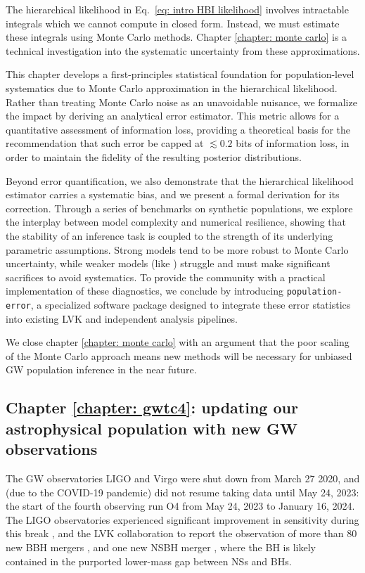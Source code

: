 \begin{refsection}
The hierarchical likelihood in Eq.~\ref{eq: intro HBI likelihood} involves intractable integrals which we cannot compute in closed form. Instead, we must estimate these integrals using Monte Carlo methods. Chapter \ref{chapter: monte carlo} is a technical investigation into the systematic uncertainty from these approximations. 

This chapter develops a first-principles statistical foundation for population-level systematics due to Monte Carlo approximation in the hierarchical likelihood. Rather than treating Monte Carlo noise as an unavoidable nuisance, we formalize the impact by deriving an analytical error estimator. This metric allows for a quantitative assessment of information loss, providing a theoretical basis for the recommendation that such error be capped at $\lesssim 0.2$ bits of information loss, in order  to maintain the fidelity of the resulting posterior distributions.

Beyond error quantification, we also demonstrate that the hierarchical likelihood estimator carries a systematic bias, and we present a formal derivation for its correction. Through a series of benchmarks on synthetic populations, we explore the interplay between model complexity and numerical resilience, showing that the stability of an inference task is coupled to the strength of its underlying parametric assumptions. Strong models tend to be more robust to Monte Carlo uncertainty, while weaker models (like \PixelPop) struggle and must make significant sacrifices to avoid systematics. To provide the community with a practical implementation of these diagnostics, we conclude by introducing \texttt{population-error}, a specialized software package designed to integrate these error statistics into existing \ac{LVK} and independent analysis pipelines.

We close chapter \ref{chapter: monte carlo} with an argument that the poor scaling of the Monte Carlo approach means new methods will be necessary for unbiased \ac{GW} population inference in the near future.

\subsection{Chapter \ref{chapter: gwtc4}: updating our astrophysical population with new \ac{GW} observations}

The \ac{GW} observatories \ac{LIGO} \citep{TheLIGOScientific:2014jea} and Virgo \citep{VIRGO:2014yos} were shut down from March 27 2020, and (due to the COVID-19 pandemic) did not resume taking data until May 24, 2023: the start of the fourth observing run O4 \citep{Capote:2024rmo, LIGO:2024kkz} from May 24, 2023 to January
16, 2024. The LIGO observatories experienced significant improvement in sensitivity during this break \citep{LIGO:2020zwl,LIGOO4Detector:2023wmz,LIGO:2024kkz}, and the \ac{LVK} collaboration to report the observation of more than $80$ new \ac{BBH} mergers \citep{abac_gwtc-40_catalog_2025}, and one new \ac{NSBH} merger \citep{abac_observation_2024}, where the \ac{BH} is likely contained in the purported lower-mass gap between \acp{NS} and \acp{BH}.


\end{refsection}
